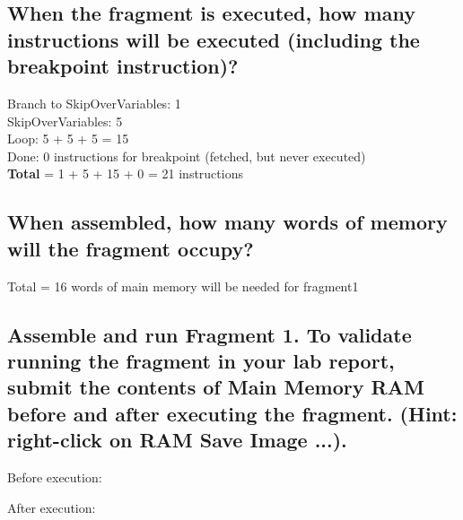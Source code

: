 \documentclass{article}
\begin{document}
	\subsection{When the fragment is executed, how many instructions will be executed (including the breakpoint instruction)?}
	Branch to SkipOverVariables: 1\\
	SkipOverVariables: 5\\
	Loop: 5 + 5 + 5 = 15\\
	Done: 0 instructions for breakpoint (fetched, but never executed)\\
	\textbf{Total} = 1 + 5 + 15 + 0 = 21 instructions
	
	\subsection{When assembled, how many words of memory will the fragment occupy?}
	Total = 16 words of main memory will be needed for fragment1
	
	\pagebreak
	
	\subsection{Assemble and run Fragment 1. To validate running the fragment in your lab report, submit the contents of Main Memory RAM before and after executing the fragment. (Hint: right-click on RAM Save Image ...).}
	
	Before execution:\\

	\vspace{0.5cm}

	After execution:\\
	\\
\end{document}
